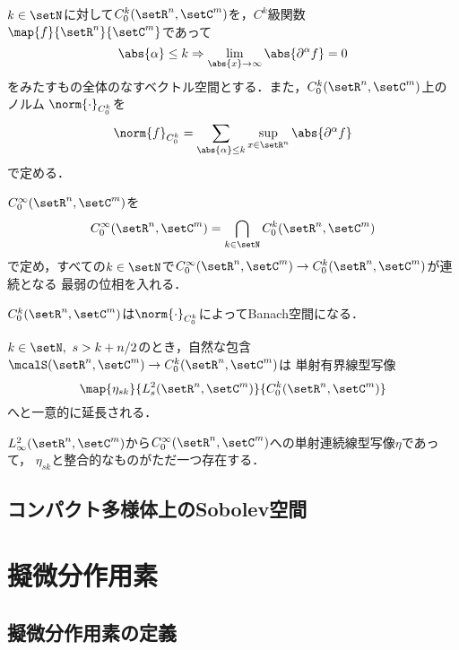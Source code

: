 \documentclass[uplatex,dvipdfmx]{jsarticle}
\newcommand{\sobolev}[1]{L^{2}_{#1}}
\newcommand{\sobolevlocal}[3]{\sobolev{#1}(\setR^{#2},\setC^{#3})}
\newcommand{\schwartz}[2]{\mcalS(\setR^{#1},\setC^{#2})}
\begin{document}
\begin{definition}
  \begin{enumarabicp}
    \item $k\in \setN$に対して$C^k_0(\setR^n,\setC^m)$を，$C^k$級関数$\map{f}{\setR^n}{\setC^m}$であって
    \[ \abs{\alpha}\leq k \Rightarrow \lim_{\abs{x}\to \infty} \abs{\partial^\alpha f} = 0 \]
    をみたすもの全体のなすベクトル空間とする．また，$C^k_0(\setR^n,\setC^m)$上のノルム
    $\norm{\cdot}_{C^k_0}$を
    \[ \norm{f}_{C^k_0} = \sum_{\abs{\alpha}\leq k} \sup_{x\in \setR^n} \abs{\partial^\alpha f} \]
    で定める．
    \item $C^\infty_0(\setR^n,\setC^m)$を
    \[C^\infty_0(\setR^n,\setC^m) = \bigcap_{k\in \setN} C^k_0(\setR^n,\setC^m) \]
    で定め，すべての$k\in \setN$で$C^\infty_0(\setR^n,\setC^m)\to C^k_0(\setR^n,\setC^m)$が連続となる
    最弱の位相を入れる．
  \end{enumarabicp}
\end{definition}

\begin{proposition}
  $C^k_0(\setR^n,\setC^m)$は$\norm{\cdot}_{C^k_0}$によってBanach空間になる．
\end{proposition}

\begin{theorem}[Sobolevの埋め込み定理]\label{Sobolev embedding}
  $k\in \setN,\ s>k+n/2$のとき，自然な包含$\schwartz{n}{m}\to C^k_0(\setR^n,\setC^m)$は
  単射有界線型写像
  \[ \map{\eta_{sk}}{\sobolevlocal{s}{n}{m}}{C^k_0(\setR^n,\setC^m)}\]
  へと一意的に延長される．
\end{theorem}

\begin{corollary}
  $\sobolevlocal{\infty}{n}{m}$から$C^\infty_0(\setR^n,\setC^m)$への単射連続線型写像$\eta$であって，
  $\eta_{sk}$と整合的なものがただ一つ存在する．
\end{corollary}

\subsection{コンパクト多様体上のSobolev空間}

\newpage
\section{擬微分作用素}

\subsection{擬微分作用素の定義}
\end{document}

